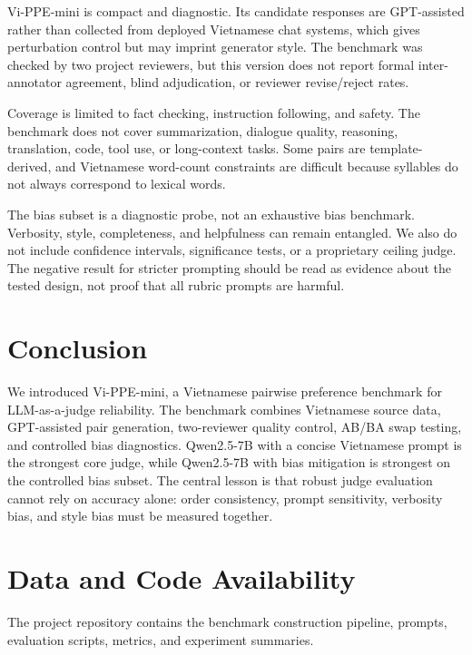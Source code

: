\documentclass[pdflatex,sn-mathphys-num]{sn-jnl}
\begin{document}
Vi-PPE-mini is compact and diagnostic. Its candidate responses are GPT-assisted rather than collected from deployed Vietnamese chat systems, which gives perturbation control but may imprint generator style. The benchmark was checked by two project reviewers, but this version does not report formal inter-annotator agreement, blind adjudication, or reviewer revise/reject rates.

Coverage is limited to fact checking, instruction following, and safety. The benchmark does not cover summarization, dialogue quality, reasoning, translation, code, tool use, or long-context tasks. Some pairs are template-derived, and Vietnamese word-count constraints are difficult because syllables do not always correspond to lexical words.

The bias subset is a diagnostic probe, not an exhaustive bias benchmark. Verbosity, style, completeness, and helpfulness can remain entangled. We also do not include confidence intervals, significance tests, or a proprietary ceiling judge. The negative result for stricter prompting should be read as evidence about the tested design, not proof that all rubric prompts are harmful.

\section{Conclusion}

We introduced Vi-PPE-mini, a Vietnamese pairwise preference benchmark for LLM-as-a-judge reliability. The benchmark combines Vietnamese source data, GPT-assisted pair generation, two-reviewer quality control, AB/BA swap testing, and controlled bias diagnostics. Qwen2.5-7B with a concise Vietnamese prompt is the strongest core judge, while Qwen2.5-7B with bias mitigation is strongest on the controlled bias subset. The central lesson is that robust judge evaluation cannot rely on accuracy alone: order consistency, prompt sensitivity, verbosity bias, and style bias must be measured together.

\section*{Data and Code Availability}

The project repository contains the benchmark construction pipeline, prompts, evaluation scripts, metrics, and experiment summaries.
\end{document}
